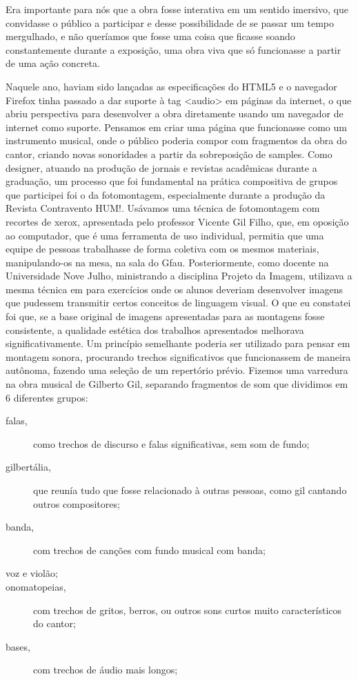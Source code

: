 Era importante para nós que a obra fosse interativa em um sentido imersivo, que convidasse o público a participar e desse possibilidade de se passar um tempo mergulhado, e não queríamos que fosse uma coisa que ficasse soando constantemente durante a exposição, uma obra viva que só funcionasse a partir de uma ação concreta. 

Naquele ano, haviam sido lançadas as especificações do HTML5 e o navegador Firefox tinha passado a dar suporte à tag <audio> em páginas da internet, o que abriu perspectiva para desenvolver a obra diretamente usando um navegador de internet como suporte. Pensamos em criar uma página que funcionasse como um instrumento musical, onde o público poderia compor com fragmentos da obra do cantor, criando novas sonoridades a partir da sobreposição de samples. 
Como designer, atuando na produção de jornais e revistas acadêmicas durante a graduação, um processo que foi fundamental na prática compositiva de grupos que participei foi o da fotomontagem, especialmente durante a produção da Revista Contravento HUM!. Usávamos uma técnica de fotomontagem com recortes de xerox, apresentada pelo professor Vicente Gil Filho, que, em oposição ao computador, que é uma ferramenta de uso individual, permitia que uma equipe de pessoas trabalhasse de forma coletiva com os mesmos materiais, manipulando-os na mesa, na sala do Gfau. Posteriormente, como docente na Universidade Nove Julho, ministrando a disciplina Projeto da Imagem, utilizava a mesma técnica em para exercícios onde os alunos deveriam desenvolver imagens que pudessem transmitir certos conceitos de linguagem visual. O que eu constatei foi que, se a base original de imagens apresentadas para as montagens fosse consistente, a qualidade estética dos trabalhos apresentados melhorava significativamente. 
Um princípio semelhante poderia ser utilizado para pensar em montagem sonora, procurando trechos significativos que funcionassem de maneira autônoma, fazendo uma seleção de um repertório prévio. Fizemos uma varredura na obra musical de Gilberto Gil, separando fragmentos de som que dividimos em 6 diferentes grupos: 

\begin{description}
\item[falas,]{ como trechos de discurso e falas significativas, sem som de fundo;
}
\item[gilbertália,]{ que reunía tudo que fosse relacionado à outras pessoas, como gil cantando outros compositores;
}
\item[banda,]{ com trechos de canções com fundo musical com banda;
}
\item[voz e violão;]{}
\item[onomatopeias,]{ com trechos de gritos, berros, ou outros sons curtos muito característicos do cantor;}
\item[bases,]{ com trechos de áudio mais longos; 
}

\end{description}


